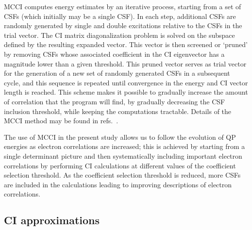 \ac{MCCI} computes energy estimates by an iterative process, starting from
a set of \acp{CSF} (which initially may be a single \ac{CSF}). In each step,
additional \acp{CSF} are randomly generated by single and double excitations
relative to the \acp{CSF} in the trial vector. The \ac{CI} matrix
diagonalization problem is solved on the subspace defined by the resulting
expanded vector. This vector is then screened or `pruned' by removing
\acp{CSF} whose associated coefficient in the \ac{CI} eigenvector has a
magnitude lower than a given threshold. This pruned vector serves as
trial vector for the generation of a new set of randomly generated
\acp{CSF} in a subsequent cycle, and  this sequence is repeated until
convergence in the energy and CI vector length is reached. This scheme
makes it possible to gradually increase the amount of correlation that
the program will find, by gradually decreasing the \ac{CSF} inclusion
threshold, while keeping the computations tractable.
Details of the \ac{MCCI} method may be found in 
refs.~\cite{mcci1995,mcci1998,mcci2000,multiref}.

The use of \ac{MCCI} in the present study allows us to follow the
evolution of \ac{QP} energies as electron correlations are
increased; this is achieved by starting from a single determinant picture
and then systematically including important electron correlations by
performing \ac{CI} calculations at different values of the coefficient
selection threshold. As the coefficient selection threshold is reduced,
more \acp{CSF} are included in the calculations leading to improving
descriptions of electron correlations.

\subsection{CI approximations}

